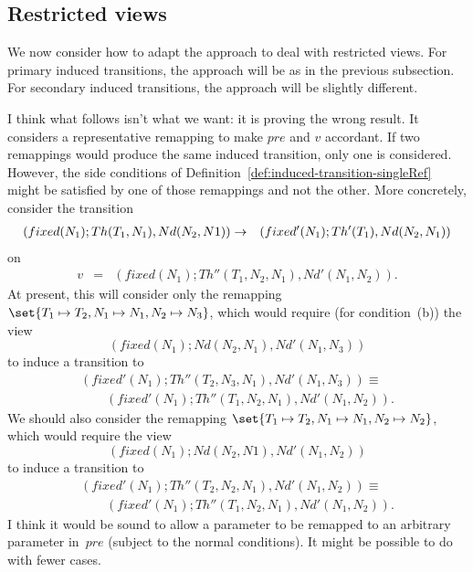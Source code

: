 \subsection{Restricted views}
\label{sec:effectOn-restricted}

We now consider how to adapt the approach to deal with restricted views.  For
primary induced transitions, the approach will be as in the previous
subsection.  For secondary induced transitions, the approach will be slightly
different. 

  I think what follows isn't what we want: it is
proving the wrong result.  It considers a representative remapping to make $pre$
and $v$ accordant.  If two remappings would  produce the same
induced transition, only one is considered.  However, the side conditions of
Definition~\ref{def:induced-transition-singleRef} might be satisfied by one of
those remappings and not the other.  More concretely, consider the transition
\begin{eqnarray*}
(fixed(N_1); Th(T_1,N_1), Nd(N_2,N1)) & \stackrel{}\rightarrow &
 (fixed'(N_1); Th'(T_1), Nd(N_2,N_1))
\end{eqnarray*}
on
\begin{eqnarray*}
v & = & (fixed(N_1); Th''(T_1,N_2,N_1), Nd'(N_1,N_2)).
\end{eqnarray*}
%
At present, this will consider only the remapping $\set{T_1 \mapsto T_2, N_1
  \mapsto N_1,\linebreak[1] {N_2 \mapsto N_3}}$, which would require (for
condition~(b)) the view
\[
(fixed(N_1); Nd(N_2,N_1), Nd'(N_1,N_3))
\]
to induce a transition to
\[
\begin{align}
(fixed'(N_1); Th''(T_2,N_3,N_1), Nd'(N_1,N_3)) \equiv \\
\qquad (fixed'(N_1); Th''(T_1,N_2,N_1), Nd'(N_1,N_2)).
\end{align}
\]
We should also consider the remapping $\set{T_1 \mapsto T_2, N_1 \mapsto N_1,
  N_2 \mapsto N_2}$, which would require the view
\[
(fixed(N_1); Nd(N_2,N1), Nd'(N_1,N_2))
\]
to induce a transition to
\[
\begin{align}
(fixed'(N_1); Th''(T_2,N_2,N_1), Nd'(N_1,N_2)) \equiv \\
\qquad (fixed'(N_1); Th''(T_1,N_2,N_1), Nd'(N_1,N_2)).
\end{align}
\]
I think it would be sound to allow a parameter to be remapped to an arbitrary
parameter in~$pre$ (subject to the normal conditions).  It might be possible
to do with fewer cases. 


